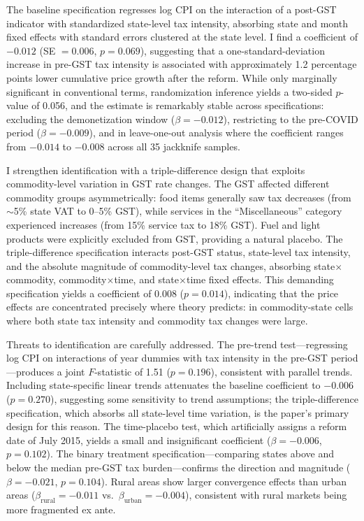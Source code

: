 \documentclass[12pt]{article}
\begin{document}
The baseline specification regresses log CPI on the interaction of a post-GST indicator with standardized state-level tax intensity, absorbing state and month fixed effects with standard errors clustered at the state level. I find a coefficient of $-0.012$ (SE $= 0.006$, $p = 0.069$), suggesting that a one-standard-deviation increase in pre-GST tax intensity is associated with approximately 1.2 percentage points lower cumulative price growth after the reform. While only marginally significant in conventional terms, randomization inference yields a two-sided $p$-value of 0.056, and the estimate is remarkably stable across specifications: excluding the demonetization window ($\beta = -0.012$), restricting to the pre-COVID period ($\beta = -0.009$), and in leave-one-out analysis where the coefficient ranges from $-0.014$ to $-0.008$ across all 35 jackknife samples.

I strengthen identification with a triple-difference design that exploits commodity-level variation in GST rate changes. The GST affected different commodity groups asymmetrically: food items generally saw tax decreases (from $\sim$5\% state VAT to 0--5\% GST), while services in the ``Miscellaneous'' category experienced increases (from 15\% service tax to 18\% GST). Fuel and light products were explicitly excluded from GST, providing a natural placebo. The triple-difference specification interacts post-GST status, state-level tax intensity, and the absolute magnitude of commodity-level tax changes, absorbing state$\times$commodity, commodity$\times$time, and state$\times$time fixed effects. This demanding specification yields a coefficient of 0.008 ($p = 0.014$), indicating that the price effects are concentrated precisely where theory predicts: in commodity-state cells where both state tax intensity and commodity tax changes were large.

Threats to identification are carefully addressed. The pre-trend test---regressing log CPI on interactions of year dummies with tax intensity in the pre-GST period---produces a joint $F$-statistic of 1.51 ($p = 0.196$), consistent with parallel trends. Including state-specific linear trends attenuates the baseline coefficient to $-0.006$ ($p = 0.270$), suggesting some sensitivity to trend assumptions; the triple-difference specification, which absorbs all state-level time variation, is the paper's primary design for this reason. The time-placebo test, which artificially assigns a reform date of July 2015, yields a small and insignificant coefficient ($\beta = -0.006$, $p = 0.102$). The binary treatment specification---comparing states above and below the median pre-GST tax burden---confirms the direction and magnitude ($\beta = -0.021$, $p = 0.104$). Rural areas show larger convergence effects than urban areas ($\beta_{\text{rural}} = -0.011$ vs.\ $\beta_{\text{urban}} = -0.004$), consistent with rural markets being more fragmented ex ante.
\end{document}
